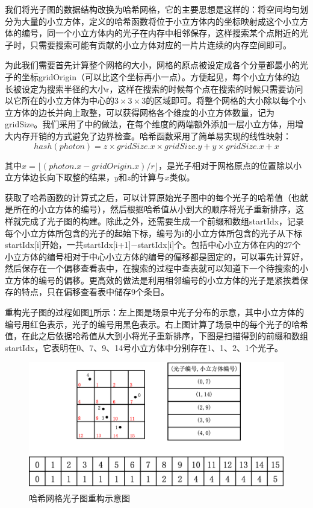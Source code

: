 \documentclass[UTF8]{ctexart}
\begin{document}
    我们将光子图的数据结构改换为哈希网格\cite{fleisz2009photon}，它的主要思想是这样的：将空间均匀划分为大量的小立方体，定义的哈希函数将位于小立方体内的坐标映射成这个小立方体的编号，同一个小立方体内的光子在内存中相邻保存，这样搜索某个点附近的光子时，只需要搜索可能有贡献的小立方体对应的一片片连续的内存空间即可。
    
    为此我们需要首先计算整个网格的大小，网格的原点被设定成各个分量都最小的光子的坐标gridOrigin（可以比这个坐标再小一点）。方便起见，每个小立方体的边长被设定为搜索半径的大小r，这样在搜索的时候每个点在搜索的时候只需要访问以它所在的小立方体为中心的$3\times3\times3$的区域即可。将整个网格的大小除以每个小立方体的边长并向上取整，可以获得网格各个维度的小立方体数量，记为gridSize。我们采用了\cite{gupte2011real}中的做法，在每个维度的两端额外添加一层小立方体，用增大内存开销的方式避免了边界检查。哈希函数采用了简单易实现的线性映射：
    $$hash(photon)=z \times gridSize.x \times gridSize.y + y \times gridSize.x + x$$
    
    其中$x=\lfloor(photon.x-gridOrigin.x)/r\rfloor$，是光子相对于网格原点的位置除以小立方体边长向下取整的结果，$y$和$z$的计算与$x$类似。
    
    获取了哈希函数的计算式之后，可以计算原始光子图中的每个光子的哈希值（也就是所在的小立方体的编号），然后根据哈希值从小到大的顺序将光子重新排序，这样就完成了光子图的构建。除此之外，还需要生成一个前缀和数组startIdx，记录每个小立方体所包含的光子的起始下标，编号为i的小立方体所包含的光子从下标startIdx[i]开始，一共startIdx[i+1]$-$startIdx[i]个。包括中心小立方体在内的27个小立方体的编号相对于中心小立方体的编号的偏移都是固定的，可以事先计算好，然后保存在一个偏移查看表中，在搜索的过程中查表就可以知道下一个待搜索的小立方体的编号的偏移。更高效的做法是利用相邻编号的小立方体的光子是紧挨着保存的特点，只在偏移查看表中储存9个条目。
    
    重构光子图的过程如图\ref{fig:1}所示：左上图是场景中光子分布的示意，其中小立方体的编号用红色表示，光子的编号用黑色表示。右上图计算了场景中的每个光子的哈希值，在此之后依据哈希值从大到小将光子重新排序，下图是扫描得到的前缀和数组startIdx，它表明在0、7、9、14号小立方体中分别存在1、1、2、1个光子。
    
    \begin{figure}[htbp]
    \centering
    \includegraphics[scale=0.6]{pic/HashGridPhotonRebuild.png}
    \caption{哈希网格光子图重构示意图}
    \label{fig:1}
    \end{figure}
    
\end{document}
